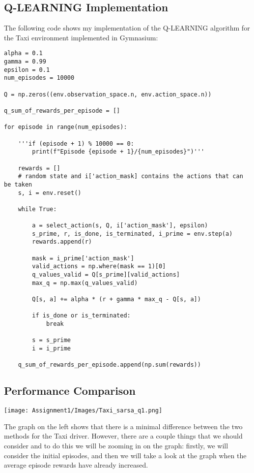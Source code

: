 \documentclass[11pt,a4paper]{article}
\begin{document}
\subsection{Q-LEARNING Implementation}

The following code shows my implementation of the Q-LEARNING algorithm for the Taxi environment implemented in Gymnasium: \\

\begin{lstlisting}
alpha = 0.1
gamma = 0.99
epsilon = 0.1
num_episodes = 10000

Q = np.zeros((env.observation_space.n, env.action_space.n))

q_sum_of_rewards_per_episode = []

for episode in range(num_episodes):

    '''if (episode + 1) % 10000 == 0:
        print(f"Episode {episode + 1}/{num_episodes}")'''

    rewards = []
    # random state and i['action_mask] contains the actions that can be taken
    s, i = env.reset()

    while True:
    
        a = select_action(s, Q, i['action_mask'], epsilon)
        s_prime, r, is_done, is_terminated, i_prime = env.step(a)
        rewards.append(r)

        mask = i_prime['action_mask']
        valid_actions = np.where(mask == 1)[0]
        q_values_valid = Q[s_prime][valid_actions]
        max_q = np.max(q_values_valid)

        Q[s, a] += alpha * (r + gamma * max_q - Q[s, a])

        if is_done or is_terminated:
            break

        s = s_prime
        i = i_prime
    
    q_sum_of_rewards_per_episode.append(np.sum(rewards))
\end{lstlisting}



\subsection{Performance Comparison}

\noindent
\begin{minipage}{0.5\textwidth}
    \texttt{[image: Assignment1/Images/Taxi\_sarsa\_q1.png]}
\end{minipage}%
\hfill%
\begin{minipage}{0.45\textwidth}
    The graph on the left shows that there is a minimal difference between the two methods for the Taxi driver. However, there are a couple things that we should consider and to do this we will be zooming in on the graph: firstly, we will consider the initial episodes, and then we will take a look at the graph when the average episode rewards have already increased.
\end{minipage}
\end{document}
